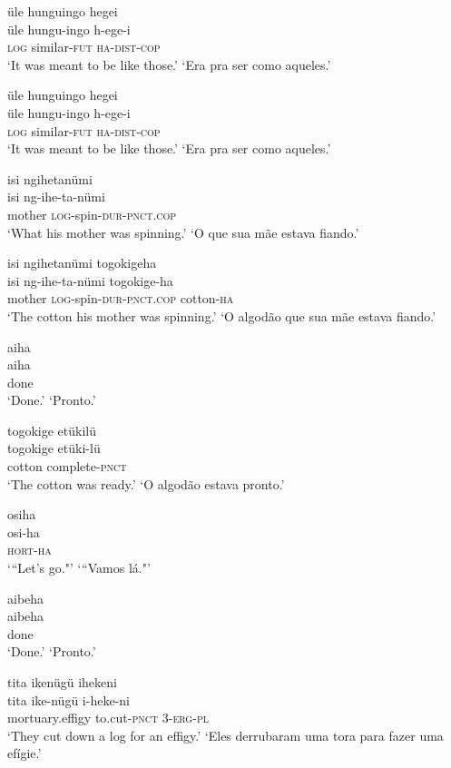 \documentclass[output=paper,
modfonts,nonflat
]{langsci/langscibook}
\begin{document}
\ea  üle hunguingo hegei\\[.3em]
\gll üle hungu-ingo h-ege-i\\
     \textsc{log} similar-\textsc{fut} \textsc{ha}-\textsc{dist}-\textsc{cop}\\
\glt ‘It was meant to be like those.’
\glt ‘Era pra ser como aqueles.’
\z

\ea  üle hunguingo hegei\\[.3em]
\gll üle hungu-ingo h-ege-i\\
     \textsc{log} similar-\textsc{fut} \textsc{ha}-\textsc{dist}-\textsc{cop}\\
\glt ‘It was meant to be like those.’
\glt ‘Era pra ser como aqueles.’
\z

\ea  isi ngihetanümi\\[.3em]
\gll isi ng-ihe-ta-nümi\\
     mother \textsc{log}-spin-\textsc{dur}-\textsc{pnct.cop}\\
\glt ‘What his mother was spinning.’
\glt ‘O que sua mãe estava fiando.’
\z

\ea  isi ngihetanümi togokigeha\\[.3em]
\gll isi ng-ihe-ta-nümi togokige-ha\\
     mother \textsc{log}-spin-\textsc{dur}-\textsc{pnct.cop} cotton-\textsc{ha}\\
\glt ‘The cotton his mother was spinning.’
\glt ‘O algodão que sua mãe estava fiando.’
\z

\ea  aiha\\[.3em]
\gll aiha\\
     done\\
\glt ‘Done.’
\glt ‘Pronto.’
\z

\ea  togokige etükilü\\[.3em]
\gll togokige etüki-lü\\
     cotton complete-\textsc{pnct}\\
\glt ‘The cotton was ready.’
\glt ‘O algodão estava pronto.’
\z

\ea  osiha\\[.3em]
\gll osi-ha\\
     \textsc{hort}-\textsc{ha}\\
\glt ‘“Let's go."’
\glt ‘“Vamos lá."’
\z

\ea  aibeha\\[.3em]
\gll aibeha\\
     done\\
\glt ‘Done.’
\glt ‘Pronto.’
\z

\ea  tita ikenügü ihekeni\\[.3em]
\gll tita ike-nügü i-heke-ni\\
     mortuary.effigy to.cut-\textsc{pnct} 3-\textsc{erg}-\textsc{pl}\\
\glt ‘They cut down a log for an effigy.’
\glt ‘Eles derrubaram uma tora para fazer uma efígie.’
\z
\end{document}
